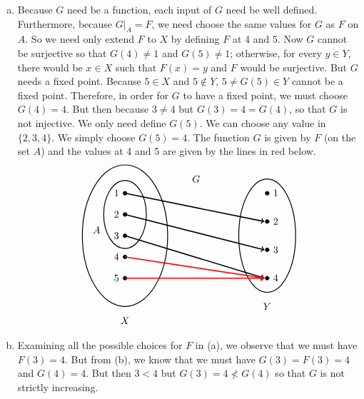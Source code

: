 \documentclass[11pt,letterpaper]{article}
\begin{document}
\begin{enumerate}[(a)]
\item Because $G$ need be a function, each input of $G$ need be well defined. Furthermore, because $G \big|_A= F$, we need choose the same values for $G$ as $F$ on $A$. So we need only extend $F$ to $X$ by defining $F$ at 4 and 5. Now $G$ cannot be surjective so that $G(4) \neq 1$ and $G(5) \neq 1$; otherwise, for every $y \in Y$, there would be $x \in X$ such that $F(x)= y$ and $F$ would be surjective. But $G$ needs a fixed point. Because $5 \in X$ and $5 \notin Y$, $5 \neq G(5) \in Y$ cannot be a fixed point. Therefore, in order for $G$ to have a fixed point, we must choose $G(4)= 4$. But then because $3 \neq 4$ but $G(3)= 4= G(4)$, so that $G$ is not injective. We only need define $G(5)$. We can choose any value in $\{ 2, 3, 4 \}$. We simply choose $G(5)= 4$. The function $G$ is given by $F$ (on the set $A$) and the values at 4 and 5 are given by the lines in red below. 
	\[
	\begin{tikzpicture}
	\node at (2.5,2) {$G$};
	
	\draw[line width=0.03cm] (0,0) circle (1.5 and 2.5);
	\draw[line width=0.03cm] (0,0.75) circle (0.75 and 1.2);
	\draw[line width=0.03cm] (5,0) circle (1 and 2);
	
	\draw[fill=black] (0,1.5) circle (0.07);
	\draw[fill=black] (0,0.75) circle (0.07);
	\draw[fill=black] (0,0) circle (0.07);
	\draw[fill=black] (0,-0.75) circle (0.07);
	\draw[fill=black] (0,-1.5) circle (0.07);
	
	\draw[fill=black] (5,1.5) circle (0.07);
	\draw[fill=black] (5,0.50) circle (0.07);
	\draw[fill=black] (5,-0.5) circle (0.07);
	\draw[fill=black] (5,-1.5) circle (0.07);
	
	\draw[line width=0.04cm,->] (0,1.5) -- (4.9,0.50);
	\draw[line width=0.04cm,->] (0,0.75) -- (4.9,-0.5);
	\draw[line width=0.04cm,->] (0,0) -- (4.9,-1.5);
	\draw[line width=0.04cm,->,red] (0,-0.75) -- (4.9,-1.5);
	\draw[line width=0.04cm,->,red] (0,-1.5) -- (4.9,-1.5);

	\node at (-0.3,1.5) {$1$};
	\node at (-0.3,0.75) {$2$};
	\node at (-0.3,0) {$3$};
	\node at (-0.3,-0.75) {$4$};
	\node at (-0.3,-1.5) {$5$};
	
	\node at (5.3,1.5) {$1$};
	\node at (5.3,0.5) {$2$};
	\node at (5.3,-0.5) {$3$};
	\node at (5.3,-1.5) {$4$};
	
	\node at (0,-3) {$X$};
	\node at (-1,0.2) {$A$};
	\node at (5,-2.5) {$Y$};
	\end{tikzpicture}
	\] \pspace

\item Examining all the possible choices for $F$ in (a), we observe that we must have $F(3)= 4$. But from (b), we know that we must have $G(3)= F(3)= 4$ and $G(4)= 4$. But then $3 < 4$ but $G(3)= 4 \not< G(4)$ so that $G$ is not strictly increasing. 
\end{enumerate}
\end{document}

